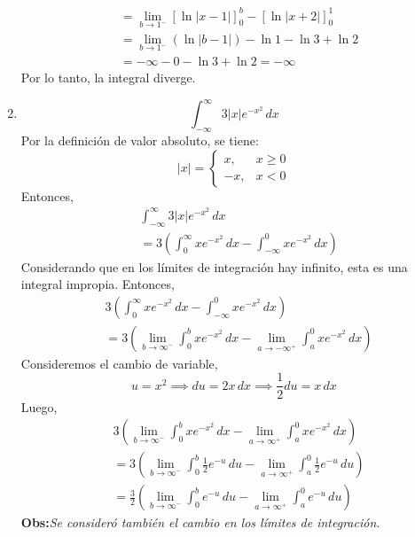 \begin{multicols}{2}
\begin{enumerate}
\[\begin{aligned}
        &= \lim_{b \to 1^{-}} \left[ \ln{|x-1|} \right]_{0}^{b} - \left[ \ln{|x+2|} \right]_{0}^{1} \\
        &= \lim_{b \to 1^{-}} \left( \ln{|b-1|}\right) - \ln{1} - \ln{3} + \ln{2} \\
        &= -\infty - 0 - \ln{3} + \ln{2} = -\infty
      \end{aligned}
    \]
    Por lo tanto, la integral diverge.
    \item
    \[
      \displaystyle \int_{-\infty}^{\infty} 3|x|e^{-x^{2}} \, dx
    \]
    Por la definición de valor absoluto, se tiene:
    \[
      |x| =
      \begin{cases}
        x, & x \geq 0 \\
        -x, & x < 0
      \end{cases}
    \]
    Entonces,
    \[
      \begin{aligned}
        &\int_{-\infty}^{\infty} 3|x|e^{-x^{2}} \, dx \\
        &= 3\left(\int_{0}^{\infty} xe^{-x^{2}} \, dx - \int_{-\infty}^{0} xe^{-x^{2}} \, dx\right)
      \end{aligned}
    \]
    Considerando que en los límites de integración hay infinito, esta es una integral impropia. Entonces,
    \[
      \begin{aligned}
        &3\left(\int_{0}^{\infty} xe^{-x^{2}} \, dx - \int_{-\infty}^{0} xe^{-x^{2}} \, dx\right) \\
        &= 3\left(\lim_{b \to \infty^{-}} \int_{0}^{b} xe^{-x^{2}} \, dx - \lim_{a \to -\infty^{+}} \int_{a}^{0} xe^{-x^{2}} \, dx\right)
      \end{aligned}
    \]
    Consideremos el cambio de variable,
    \[
      u = x^{2} \implies du = 2x \, dx \implies \frac{1}{2} du = x \, dx
    \]
    Luego,
    \[
      \begin{aligned}
        &3\left(\lim_{b \to \infty^{-}} \int_{0}^{b} xe^{-x^{2}} \, dx - \lim_{a \to \infty^{+}} \int_{a}^{0} xe^{-x^{2}} \, dx\right) \\
        &= 3\left(\lim_{b \to \infty^{-}} \int_{0}^{b} \frac{1}{2} e^{-u} \, du - \lim_{a \to \infty^{+}} \int_{a}^{0} \frac{1}{2} e^{-u} \, du\right) \\
        &= \frac{3}{2}\left(\lim_{b \to \infty^{-}} \int_{0}^{b} e^{-u} \, du - \lim_{a \to \infty^{+}} \int_{a}^{0} e^{-u} \, du\right)
      \end{aligned}
    \]
    \textbf{Obs:}\textit{\quad Se consideró también el cambio en los límites de integración.}


\end{enumerate}
\end{multicols}
